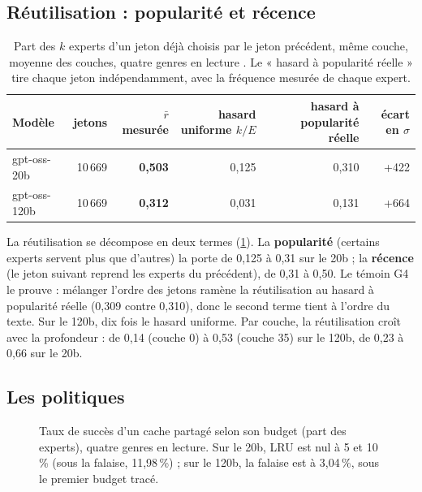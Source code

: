 \subsection{Réutilisation : popularité et récence}

\begin{table}[ht]
\centering\small
\caption[La réutilisation d'un jeton au suivant]{Part des $k$ experts d'un jeton déjà choisis par le jeton précédent, même couche, moyenne des couches, quatre genres en lecture \mes. Le « hasard à popularité réelle » tire chaque jeton indépendamment, avec la fréquence mesurée de chaque expert.}
\label{tab:t2o-reutilisation}
\begin{tabular}{@{}lrrrrr@{}}
\toprule
Modèle & jetons & $\bar r$ mesurée & hasard uniforme $k/E$ & hasard à popularité réelle & écart en $\sigma$ \\
\midrule
gpt-oss-20b & 10\,669 & \textbf{0,503} & 0,125 & 0,310 & +422 \\
gpt-oss-120b & 10\,669 & \textbf{0,312} & 0,031 & 0,131 & +664 \\
\bottomrule
\end{tabular}
\end{table}

La réutilisation se décompose en deux termes (\cref{tab:t2o-reutilisation}). La \textbf{popularité} (certains experts servent plus que d'autres) la porte de 0,125 à 0,31 sur le 20b ; la \textbf{récence} (le jeton suivant reprend les experts du précédent), de 0,31 à 0,50. Le témoin G4 le prouve : mélanger l'ordre des jetons ramène la réutilisation au hasard à popularité réelle (0,309 contre 0,310), donc le second terme tient à l'ordre du texte. Sur le 120b, dix fois le hasard uniforme. Par couche, la réutilisation croît avec la profondeur : de 0,14 (couche 0) à 0,53 (couche 35) sur le 120b, de 0,23 à 0,66 sur le 20b.

\subsection{Les politiques}

\begin{figure}[ht]
\centering
\GrapheCchSucces
\caption[Succès selon le budget, cinq politiques]{Taux de succès d'un cache partagé selon son budget (part des experts), quatre genres en lecture. Sur le 20b, LRU est nul à 5 et 10\,\% (sous la falaise, 11,98\,\%) ; sur le 120b, la falaise est à 3,04\,\%, sous le premier budget tracé.}
\label{fig:t2o-succes}
\end{figure}

